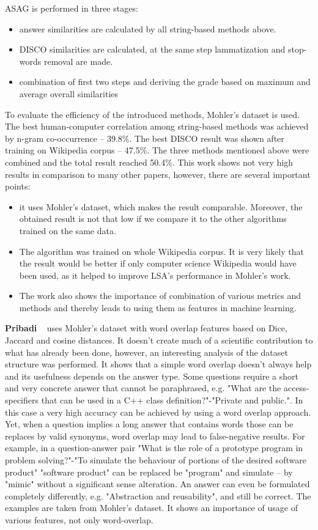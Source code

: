 ASAG is performed in three stages:
\begin{itemize}
\item answer similarities are calculated by all string-based methods above.
\item DISCO similarities are calculated, at the same step lammatization and stop-words removal are made.
\item combination of first two steps and deriving the grade based on maximum and average overall similarities
\end{itemize}
To evaluate the efficiency of the introduced methods, Mohler's dataset is used. The best human-computer correlation among string-based methods was achieved by n-gram co-occurrence -- 39.8\%. The best DISCO result was shown after training on Wikipedia corpus -- 47.5\%. The three methods mentioned above were combined and the total result reached 50.4\%. This work shows not very high results in comparison to many other papers, however, there are several important points:
\begin{itemize}
\item it uses Mohler's dataset, which  makes the result comparable. Moreover, the obtained result is not that low if we compare it to the other algorithms trained on the same data.
\item The algorithm was trained on whole Wikipedia corpus. It is very likely that the result would be better if only computer science Wikipedia would have been used, as it helped to improve LSA's performance in Mohler's work.
\item The work also shows the importance of combination of various metrics and methods and thereby leads to using them as features in machine learning.
\end{itemize}

\textbf{Pribadi} ~\cite{Pribadi} uses Mohler's dataset with word overlap features based on Dice, Jaccard and cosine distances. It doesn't create much of a scientific contribution to what has already been done, however, an interesting analysis of the dataset structure was performed. It shows that a simple word overlap doesn't always help and its usefulness depends on the answer type. Some questions require a short and very concrete answer that cannot be paraphrased, e.g. "What are the access-specifiers that can be used in a C++ class definition?"-"Private and public.". In this case a very high accuracy can be achieved by using a word overlap approach. Yet, when a question implies a long answer that contains words those can be replaces by valid synonyms, word overlap may lead to false-negative results. For example, in a question-answer pair "What is the role of a prototype program in problem solving?"-"To simulate the behaviour of portions of the desired software product" "software product" can be replaced be "program" and simulate -- by "mimic" without a significant sense alteration. An answer can even be formulated completely differently, e.g. "Abstraction and reusability", and still be correct. The examples are taken from Mohler's dataset. It shows an importance of usage of various features, not only word-overlap.\\


